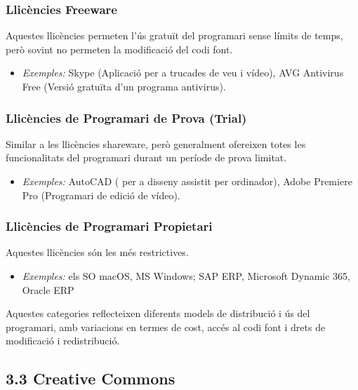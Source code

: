 \documentclass[
  12 pt,
  a4paper,
]{article}
\providecommand{\tightlist}{%
  \setlength{\itemsep}{0pt}\setlength{\parskip}{0pt}}
\begin{document}
\subsubsection{Llicències Freeware}\label{llicuxe8ncies-freeware}

Aquestes llicències permeten l'ús gratuït del programari sense límits de
temps, però sovint no permeten la modificació del codi font.

\begin{itemize}
\tightlist
\item
  \emph{Exemples:} Skype (Aplicació per a trucades de veu i vídeo), AVG
  Antivirus Free (Versió gratuïta d'un programa antivirus).
\end{itemize}

\subsubsection{Llicències de Programari de Prova
(Trial)}\label{llicuxe8ncies-de-programari-de-prova-trial}

Similar a les llicències shareware, però generalment ofereixen totes les
funcionalitats del programari durant un període de prova limitat.

\begin{itemize}
\tightlist
\item
  \emph{Exemples:} AutoCAD ( per a disseny assistit per ordinador),
  Adobe Premiere Pro (Programari de edició de vídeo).
\end{itemize}

\subsubsection{Llicències de Programari
Propietari}\label{llicuxe8ncies-de-programari-propietari}

Aquestes llicències són les més restrictives.

\begin{itemize}
\tightlist
\item
  \emph{Exemples:} els SO macOS, MS Windows; SAP ERP, Microsoft Dynamic
  365, Oracle ERP
\end{itemize}

Aquestes categories reflecteixen diferents models de distribució i ús
del programari, amb variacions en termes de cost, accés al codi font i
drets de modificació i redistribució.

\subsection{3.3 Creative Commons}\label{creative-commons}
\end{document}
